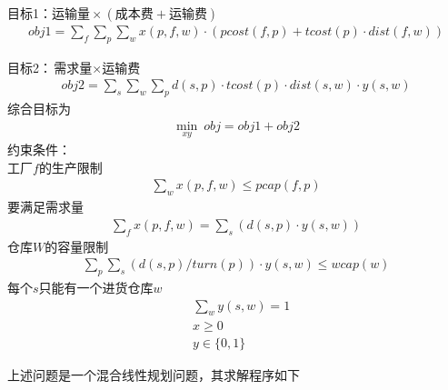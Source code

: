         \par
        目标1：$\text{运输量}\times(\text{成本费}+\text{运输费})$
        \begin{align*}
        obj1=\mathop{\sum}\limits_{f}\mathop{\sum}\limits_{p}\mathop{\sum}\limits_{w} x(p,f,w)\cdot (pcost(f,p)+tcost(p)\cdot dist(f,w))
        \end{align*}
        \par
        目标2：$\text{需求量} \times \text{运输费}$
        \begin{align*}
        obj2=\mathop{\sum}\limits_{s}\mathop{\sum}\limits_{w}\mathop{\sum}\limits_{p} d(s,p)\cdot tcost(p)\cdot dist(s,w)\cdot y(s,w)
        \end{align*}
        综合目标为
        \begin{align*}
        \mathop{\min}\limits_{xy} \ obj=obj1+obj2
        \end{align*}
        约束条件：\\
        工厂$f$的生产限制
        \begin{align*}
        \mathop{\sum}\limits_{w} x(p,f,w) \leqslant pcap(f,p)
        \end{align*}
        要满足需求量
        \begin{align*}
        \mathop{\sum}\limits_{f} x(p,f,w) = \mathop{\sum}\limits_{s} (d(s,p)\cdot y(s,w))
        \end{align*}
        仓库$W$的容量限制
        \begin{align*}
        \mathop{\sum}\limits_{p} \mathop{\sum}\limits_{s}(d(s,p) / turn(p))\cdot y(s,w) \leqslant wcap(w)
        \end{align*}
        每个$s$只能有一个进货仓库$w$
        \begin{align*}
        &\mathop{\sum}\limits_{w} y(s,w) = 1\\
        &x \geqslant 0\\
        &y \in \{0,1\}
        \end{align*}
        \par
        上述问题是一个混合线性规划问题，其求解程序如下
